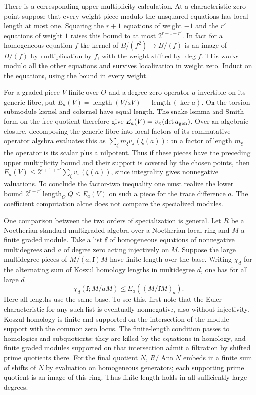 \documentclass[11pt]{amsart}
\theoremstyle{definition}
\theoremstyle{remark}
\begin{document}
There is a corresponding upper multiplicity calculation. At a
characteristic-zero point suppose that every weight piece modulo
the unsquared equations has local length at most one. Squaring
the $r+1$ equations of weight $-1$ and the $r'$ equations of weight
$1$ raises this bound to at most $2^{r+1+r'}$. In fact for a
homogeneous equation $f$ the kernel of $B/(f^2)\to B/(f)$ is
an image of $B/(f)$ by multiplication by $f$, with the weight
shifted by $\deg f$. This works modulo all the other equations and
survives localization in weight zero. Induct on the equations,
using the bound in every weight.

For a graded piece $V$ finite over $O$ and a degree-zero operator
$a$ invertible on its generic fibre, put
$E_a(V)=\operatorname{length}(V/aV)-\operatorname{length}(\ker a)$.
On the torsion submodule kernel and cokernel have equal length.
The snake lemma and Smith form on the free quotient therefore give
$E_a(V)=v_\pi(\det a_{\rm gen})$. Over an algebraic closure,
decomposing the generic fibre into local factors of its commutative
operator algebra evaluates this as $\sum_\xi m_\xi v_\pi(\xi(a))$:
on a factor of length $m_\xi$ the operator is its scalar plus a
nilpotent. Thus if these pieces have the preceding upper multiplicity
bound and their support is covered by the chosen points, then
$E_a(V)\le 2^{r+1+r'}\sum_\xi v_\pi(\xi(a))$, since integrality
gives nonnegative valuations. To conclude the factor-two inequality
one must realize the lower bound
$2^{r+r'}\operatorname{length}_O Q\le E_a(V)$ on such a piece
for the trace difference $a$. The coefficient computation alone
does not compare the specialized modules.

One comparison between the two orders of specialization is general.
Let $R$ be a Noetherian standard multigraded algebra over a
Noetherian local ring and $M$ a finite graded module. Take a list
$\mathbf f$ of homogeneous equations of nonnegative multidegrees
and $a$ of degree zero acting injectively on $M$. Suppose the large
multidegree pieces of $M/(a,\mathbf f)M$ have finite length over
the base. Writing $\chi_d$ for the alternating sum of Koszul
homology lengths in multidegree $d$, one has for all large $d$
\[
 \chi_d(\mathbf f;M/aM)\le E_a((M/\mathbf f M)_d).
\]
Here all lengths use the same base. To see this, first note that the
Euler characteristic for any such list is eventually nonnegative,
also without injectivity. Koszul homology is finite and supported on
the intersection of the module support with the common zero locus.
The finite-length condition passes to homologies and subquotients:
they are killed by the equations in homology, and finite graded
modules supported on that intersection admit a filtration by shifted
prime quotients there. For the final quotient $N$, $R/\operatorname{Ann}N$
embeds in a finite sum of shifts of $N$ by evaluation on homogeneous
generators; each supporting prime quotient is an image of this ring. Thus finite length holds in all sufficiently large degrees.
\end{document}
